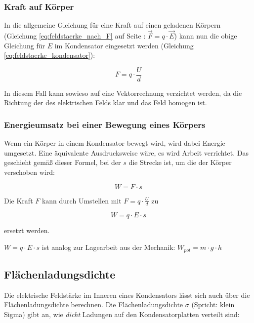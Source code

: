 \subsubsection{Kraft auf Körper}

In die allgemeine Gleichung für eine Kraft auf einen geladenen Körpern (Gleichung \ref{eq:feldstaerke_nach_F} auf Seite \pageref{eq:feldstaerke_nach_F}: $\vec{F} = q \cdot \vec{E}$) kann nun die obige Gleichung für $E$ im Kondensator eingesetzt werden (Gleichung \ref{eq:feldstaerke_kondensator}):

\begin{equation} \label{eq:kraft_kondensator}
	F = q \cdot \frac{U}{d}
\end{equation}

In diesem Fall kann sowieso auf eine Vektorrechnung verzichtet werden, da die Richtung der des elektrischen Felds klar und das Feld homogen ist.

\subsubsection{Energieumsatz bei einer Bewegung eines Körpers}

Wenn ein Körper in einem Kondensator bewegt wird, wird dabei Energie umgesetzt. Eine äquivalente Ausdrucksweise wäre, es wird \glqq Arbeit verrichtet\grqq . Das geschieht gemäß dieser Formel, bei der $s$ die Strecke ist, um die der Körper verschoben wird:

\begin{equation} \label{eq:arbeit}
	W = F \cdot s
\end{equation}

Die Kraft $F$ kann durch Umstellen mit $F = q \cdot \frac{U}{d}$ zu

\begin{equation} \label{eq:arbeit_kondensator}
	W = q \cdot E \cdot s
\end{equation}

ersetzt werden.

\begin{NiceToKnow}
$W = q \cdot E \cdot s$ ist analog zur Lagearbeit aus der Mechanik: $W_{pot} = m \cdot g \cdot h$
\end{NiceToKnow}


\subsection{Flächenladungsdichte}

Die elektrische Feldstärke im Inneren eines Kondensators lässt sich auch über die Flächenladungsdichte berechnen. Die Flächenladungsdichte $\sigma$ (Spricht: \glqq klein Sigma\grqq ) gibt an, wie \emph{dicht} Ladungen auf den Kondensatorplatten verteilt sind:

